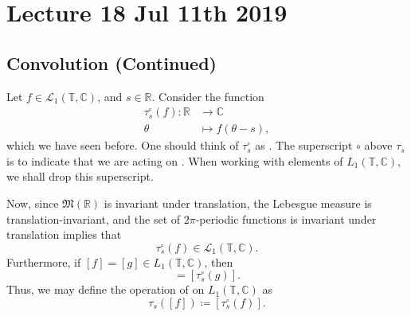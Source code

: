\documentclass[notoc,notitlepage]{tufte-book}
\begin{document}

\chapter{Lecture 18 Jul 11th 2019}%
\label{chp:lecture_18_jul_11th_2019}

\section{Convolution (Continued)}%
\label{sec:convolution_continued}

Let $f \in \mathcal{L}_1(\mathbb{T}, \mathbb{C})$, and $s \in \mathbb{R}$.
Consider the function
\begin{align*}
  \tau_s^{\circ}(f) : \mathbb{R} &\to \mathbb{C} \\
      \theta &\mapsto f(\theta - s),
\end{align*}
which we have seen before.
One should think of $\tau_s^\circ$ as .
The superscript $\circ$ above $\tau_s$ is to indicate
that we are acting on .
When working with elements of $L_1(\mathbb{T}, \mathbb{C})$,
we shall drop this superscript.

Now, since $\mathfrak{M}(\mathbb{R})$ is invariant under translation,
the Lebesgue measure is translation-invariant,
and the set of $2\pi$-periodic functions is invariant under translation
implies that
\begin{equation*}
  \tau_s^\circ(f) \in \mathcal{L}_1(\mathbb{T}, \mathbb{C}).
\end{equation*}
Furthermore, if $[f] = [g] \in L_1(\mathbb{T}, \mathbb{C})$, then
\begin{equation*}
  [\tau_s^{\circ}(f)] = [\tau_s^{\circ}(g)].
\end{equation*}
Thus, we may define the operation of 
on $L_1(\mathbb{T}, \mathbb{C})$ as
\begin{equation*}
  \tau_s([f]) \coloneqq [\tau_s^{\circ}(f)].
\end{equation*}
\end{document}
